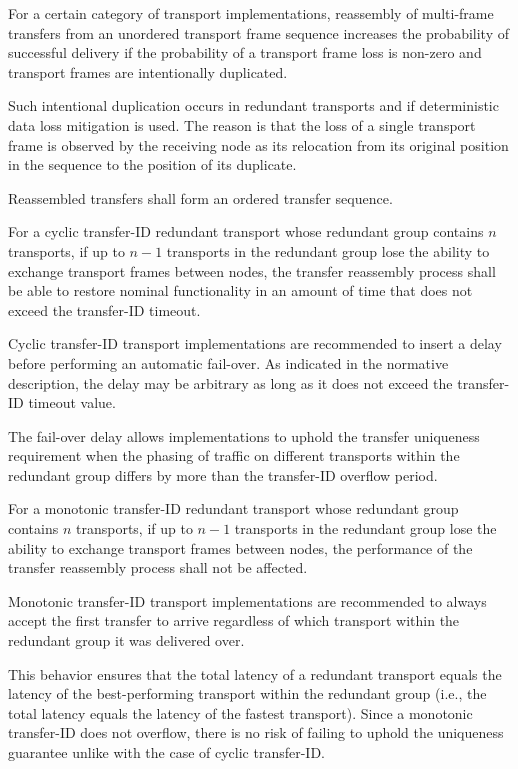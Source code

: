 \begin{remark}
    For a certain category of transport implementations, reassembly of multi-frame transfers from an
    unordered transport frame sequence increases the probability of successful delivery if
    the probability of a transport frame loss is non-zero and transport frames are intentionally duplicated.

    Such intentional duplication occurs in redundant transports and if deterministic data loss mitigation is used.
    The reason is that the loss of a single transport frame is observed by the receiving node as its relocation
    from its original position in the sequence to the position of its duplicate.
\end{remark}

Reassembled transfers shall form an ordered transfer sequence.

For a cyclic transfer-ID redundant transport whose redundant group contains $n$ transports,
if up to $n-1$ transports in the redundant group lose the ability to exchange transport frames between nodes,
the transfer reassembly process shall be able to restore nominal functionality
in an amount of time that does not exceed the transfer-ID timeout.

\begin{remark}
    Cyclic transfer-ID transport implementations are recommended to insert a delay before performing
    an automatic fail-over.
    As indicated in the normative description, the delay may be arbitrary as long as it does not exceed the
    transfer-ID timeout value.

    The fail-over delay allows implementations to uphold the transfer uniqueness requirement when the phasing of
    traffic on different transports within the redundant group differs by more than the transfer-ID overflow period.
\end{remark}

For a monotonic transfer-ID redundant transport whose redundant group contains $n$ transports,
if up to $n-1$ transports in the redundant group lose the ability to exchange transport frames between nodes,
the performance of the transfer reassembly process shall not be affected.

\begin{remark}
    Monotonic transfer-ID transport implementations are recommended to always accept the first transfer
    to arrive regardless of which transport within the redundant group it was delivered over.

    This behavior ensures that the total latency of a redundant transport equals the latency of the best-performing
    transport within the redundant group (i.e., the total latency equals the latency of the fastest transport).
    Since a monotonic transfer-ID does not overflow, there is no risk of failing to uphold the uniqueness guarantee
    unlike with the case of cyclic transfer-ID.
\end{remark}

